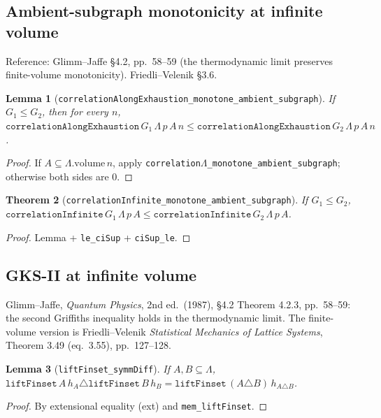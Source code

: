 \documentclass[a4paper,11pt]{article}
\newtheorem{theorem}{Theorem}
\newtheorem{lemma}[theorem]{Lemma}
\newcommand{\LeanLambda}{\texorpdfstring{\ensuremath{\Lambda}}{Lambda}}
\begin{document}
\subsection{Ambient-subgraph monotonicity at infinite volume}

Reference: Glimm--Jaffe \S 4.2, pp.\ 58--59 (the thermodynamic limit
preserves finite-volume monotonicity). Friedli--Velenik \S 3.6.

\begin{lemma}[\texttt{correlationAlongExhaustion\_monotone\_ambient\_subgraph}]
If $G_1 \le G_2$, then for every $n$,
$\texttt{correlationAlongExhaustion}\,G_1\,\Lambda\,p\,A\,n
  \le \texttt{correlationAlongExhaustion}\,G_2\,\Lambda\,p\,A\,n$.
\end{lemma}

\begin{proof}
If $A \subseteq \Lambda.\text{volume}\,n$, apply
\texttt{correlation\LeanLambda\_monotone\_ambient\_subgraph}; otherwise both sides
are 0.
\end{proof}

\begin{theorem}[\texttt{correlationInfinite\_monotone\_ambient\_subgraph}]
If $G_1 \le G_2$,
$\texttt{correlationInfinite}\,G_1\,\Lambda\,p\,A
  \le \texttt{correlationInfinite}\,G_2\,\Lambda\,p\,A$.
\end{theorem}

\begin{proof}
Lemma + \texttt{le\_ciSup} + \texttt{ciSup\_le}.
\end{proof}

\subsection{GKS-II at infinite volume}

Glimm--Jaffe, \textit{Quantum Physics}, 2nd ed.\ (1987),
\S 4.2 Theorem 4.2.3, pp.\ 58--59: the second Griffiths inequality
holds in the thermodynamic limit. The finite-volume version is
Friedli--Velenik
\textit{Statistical Mechanics of Lattice Systems}, Theorem 3.49
(eq.~3.55), pp.\ 127--128.

\begin{lemma}[\texttt{liftFinset\_symmDiff}]
If $A, B \subseteq \Lambda$,
$\texttt{liftFinset}\,A\,h_A \triangle \texttt{liftFinset}\,B\,h_B
  = \texttt{liftFinset}\,(A \triangle B)\,h_{A \triangle B}$.
\end{lemma}

\begin{proof}
By extensional equality (ext) and \texttt{mem\_liftFinset}.
\end{proof}
\end{document}
